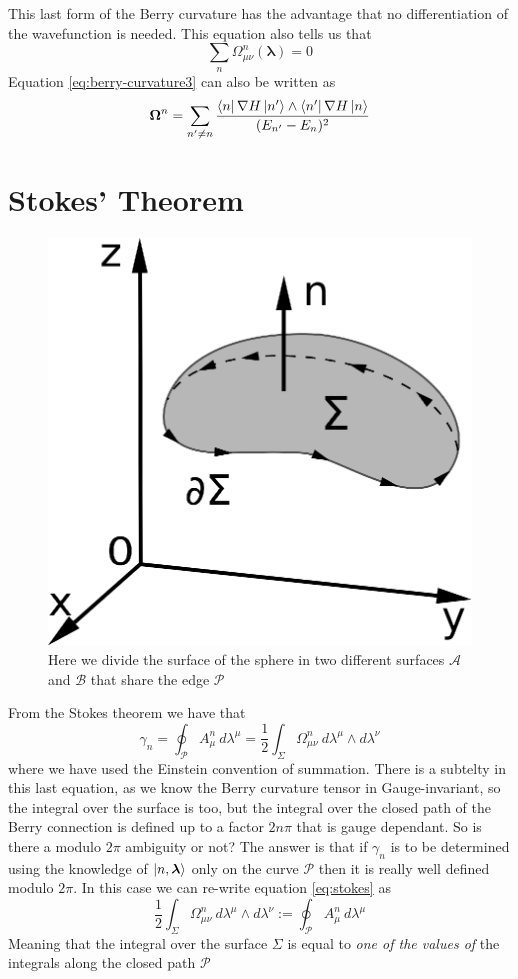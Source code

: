         This last form of the Berry curvature has the advantage that no differentiation of the wavefunction is needed. This equation also tells us that
        \[ \sum_n \Omega_{\mu\nu}^n (\boldsymbol \lambda)=0 \]
        Equation \ref{eq:berry-curvature3} can also be written as
        \begin{equation}
            \boldsymbol\Omega^n=\sum_{n'\neq n} \frac{\bra{n}\nabla H\ket{n'}\wedge\bra{n'} \nabla H\ket{n}}{(E_{n'}-E_n)^2}
        \end{equation}


    \section{Stokes' Theorem}
    \begin{figure}
        \includegraphics[width=0.7\linewidth]{Immagini/stokes.eps}
        \caption{Here we divide the surface of the sphere in two different surfaces $\mathcal A$ and $\mathcal B$ that share the edge $\mathcal P$}
    \end{figure}
    From the Stokes theorem we have that
    \begin{equation}
        \label{eq:stokes}
            \gamma_n=\oint_\mathcal{P} A^n_\mu\: d\lambda^\mu=\frac 12 \int_\Sigma \Omega_{\mu\nu}^n\: d\lambda^\mu \wedge d\lambda^\nu
    \end{equation}
    where we have used the Einstein convention of summation.\newline
    There is a subtelty in this last equation, as we know the Berry curvature tensor in Gauge-invariant, so the integral over the surface is too, but the integral over the closed path of the Berry connection is defined up to a factor $2n\pi$ that is gauge dependant.
    So is there a modulo $2\pi$ ambiguity or not?\newline
    The answer is that if $\gamma_n$ is to be determined using the knowledge of $\ket{n,\boldsymbol \lambda}$ 
    only on the curve $\mathcal P$ then it is really well defined modulo $2\pi$. In this case we can re-write 
    equation \ref{eq:stokes} as 
    \[
    \frac 12 \int_\Sigma \Omega_{\mu\nu}^n\: d\lambda^\mu \wedge d\lambda^\nu:=\oint_\mathcal{P} A^n_\mu\: d\lambda^\mu
    \]
    Meaning that the integral over the surface $\Sigma$ is equal to \textit{one of the values of} the integrals along the closed path $\mathcal P$\newline

